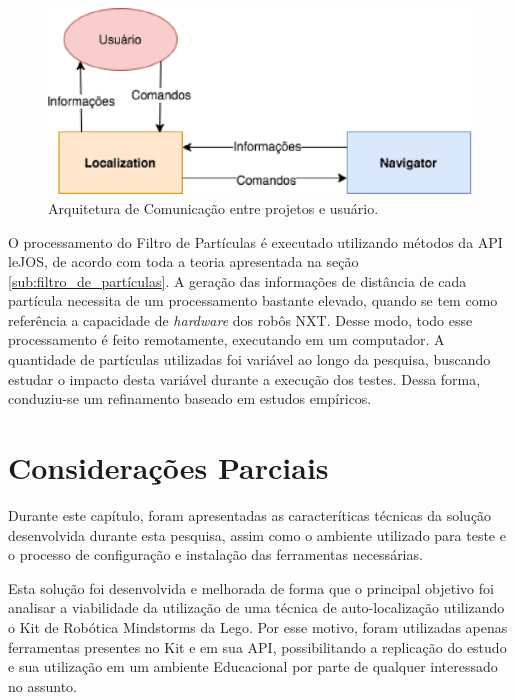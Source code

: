 	\begin{figure}[H]
		\centering
		\includegraphics[scale=0.8]{figuras/arq_pc.eps}
		\caption[Arquitetura de Comunicação]{Arquitetura de Comunicação entre projetos e usuário.}
		\label{img:arq_pc}
	\end{figure}

O processamento do Filtro de Partículas é executado utilizando métodos da API leJOS, de acordo com toda a teoria apresentada na seção
\ref{sub:filtro_de_partículas}. A geração das informações de distância de cada partícula necessita de um processamento bastante elevado,
quando se tem como referência a capacidade de \textit{hardware} dos robôs NXT. Desse modo, todo esse processamento é feito remotamente,
executando em um computador. A quantidade de partículas utilizadas foi variável ao longo da pesquisa, buscando estudar o impacto desta variável
durante a execução dos testes. Dessa forma, conduziu-se um refinamento baseado em estudos empíricos.

\section{Considerações Parciais}

Durante este capítulo, foram apresentadas as caracteríticas técnicas da solução desenvolvida durante esta pesquisa, assim como o ambiente
utilizado para teste e o processo de configuração e instalação das ferramentas necessárias.

Esta solução foi desenvolvida e melhorada de forma que o principal objetivo foi analisar a viabilidade da utilização de uma técnica
de auto-localização utilizando o Kit de Robótica Mindstorms da Lego. Por esse motivo, foram utilizadas apenas ferramentas presentes no Kit
e em sua API, possibilitando a replicação do estudo e sua utilização em um ambiente Educacional por parte de qualquer interessado no assunto.
